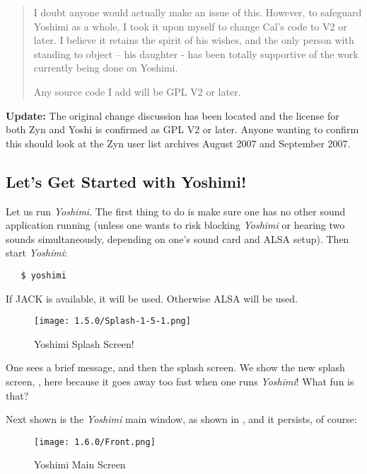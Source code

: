 \documentclass[
 11pt,
 twoside,
 a4paper,
 final                                 %
]{article}
\begin{document}
\begin{quotation}
      I doubt anyone would actually make an issue of this. However, to safeguard
      Yoshimi as a whole, I took it upon myself to change Cal's code to V2 or
      later. I believe it retains the spirit of his wishes, and the only person
      with standing to object -- his daughter - has been totally supportive of
      the work currently being done on Yoshimi.

      Any source code I add will be GPL V2 or later.
      \end{quotation}

      \textbf{Update:} The original change discussion has been located and the
      license for both Zyn and Yoshi is confirmed as GPL V2 or later. Anyone
      wanting to confirm this should look at the Zyn user list archives
      August 2007 and September 2007.


\subsection{Let's Get Started with Yoshimi!}
\label{subsec:introduction_lets_get_started}

   Let us run \textsl{Yoshimi}.
   The first
   thing to do is make sure one has no other sound application running
   (unless one wants to risk blocking \textsl{Yoshimi} or hearing two sounds
   simultaneously, depending on one's sound card and ALSA setup).
   Then start \textsl{Yoshimi}:

\begin{verbatim}
   $ yoshimi
\end{verbatim}

   If JACK is available, it will be used.  Otherwise ALSA will be used.

\begin{figure}[H]
   \centering
   \texttt{[image: 1.5.0/Splash-1-5-1.png]}
   \caption{Yoshimi Splash Screen!}
   \label{fig:yoshimi_splash_screen}
\end{figure}

   One sees a brief message, and then the splash screen.
   We show the new splash screen, ,
   here because it goes away too fast when one runs \textsl{Yoshimi}!
   What fun is that?

   Next shown is the \textsl{Yoshimi} main window,
   as shown in ,
   and it persists, of course:

\begin{figure}[H]
   \centering
   \texttt{[image: 1.6.0/Front.png]}
   \caption{Yoshimi Main Screen}
   \label{fig:yoshimi_main_screen}
\end{figure}
\end{document}
